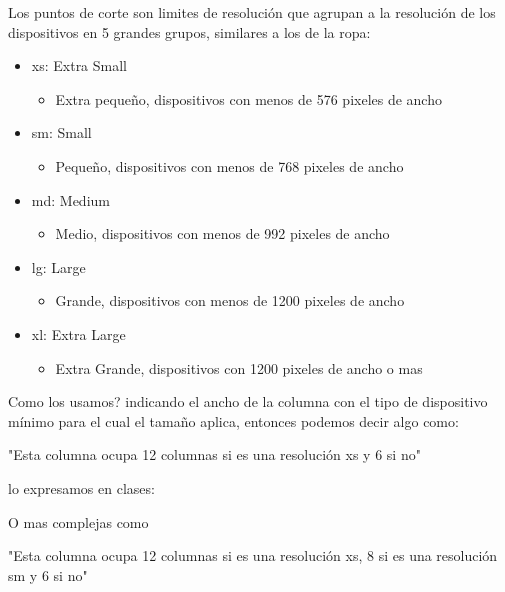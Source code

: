 \documentclass[letterpaper,10pt,spanish]{sphinxmanual}
\begin{document}
Los puntos de corte son limites de resolución que agrupan a la resolución de los
dispositivos en 5 grandes grupos, similares a los de la ropa:
\begin{itemize}
\item {} 
xs: Extra Small
\begin{itemize}
\item {} 
Extra pequeño, dispositivos con menos de 576 pixeles de ancho

\end{itemize}

\item {} 
sm: Small
\begin{itemize}
\item {} 
Pequeño, dispositivos con menos de 768 pixeles de ancho

\end{itemize}

\item {} 
md: Medium
\begin{itemize}
\item {} 
Medio, dispositivos con menos de 992 pixeles de ancho

\end{itemize}

\item {} 
lg: Large
\begin{itemize}
\item {} 
Grande, dispositivos con menos de 1200 pixeles de ancho

\end{itemize}

\item {} 
xl: Extra Large
\begin{itemize}
\item {} 
Extra Grande, dispositivos con 1200 pixeles de ancho o mas

\end{itemize}

\end{itemize}

Como los usamos? indicando el ancho de la columna con el tipo de dispositivo
mínimo para el cual el tamaño aplica, entonces podemos decir algo como:

"Esta columna ocupa 12 columnas si es una resolución xs y 6 si no"

lo expresamos en clases: 

O mas complejas como

"Esta columna ocupa 12 columnas si es una resolución xs, 8 si es una resolución sm y 6 si no"
\end{document}
